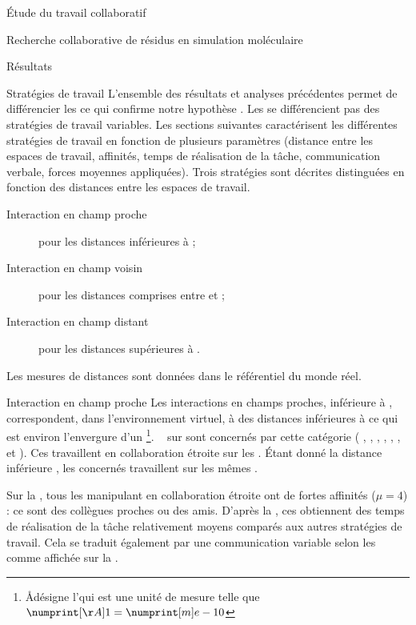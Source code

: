 \documentclass[myfrancais]{mythesis}
\begin{document}
\begin{mypart}{Étude du travail collaboratif}
\begin{mychapter}{Recherche collaborative de résidus en simulation moléculaire}
\begin{mysection}{Résultats}
\begin{mysubsection}{Stratégies de travail}
					L'ensemble des résultats et analyses précédentes permet de différencier les  ce qui confirme notre hypothèse .
					Les  se différencient pas des stratégies de travail variables.
					Les sections suivantes caractérisent les différentes stratégies de travail en fonction de plusieurs paramètres (distance entre les espaces de travail, affinités, temps de réalisation de la tâche, communication verbale, forces moyennes appliquées).
					Trois stratégies sont décrites distinguées en fonction des distances entre les espaces de travail.
					\begin{description}
						\item[Interaction en champ proche] pour les distances inférieures à ;
						\item[Interaction en champ voisin] pour les distances comprises entre  et ;
						\item[Interaction en champ distant] pour les distances supérieures à .
					\end{description}
					Les mesures de distances sont données dans le référentiel du monde réel.

					\begin{mysubsubsection}{Interaction en champ proche}
						Les interactions en champs proches, inférieure à , correspondent, dans l'environnement virtuel, à des distances inférieures à  ce qui est environ l'envergure d'un \footnote{\og \AA \fg désigne l'\myangstrom qui est une unité de mesure telle que $\mynum[\AA]{1} = \mynum[m]{e-10}$}.
						~ sur  sont concernés par cette catégorie ( , , , , , ,  et ).
						Ces  travaillent en collaboration étroite sur les .
						Étant donné la distance inférieure , les  concernés travaillent sur les mêmes .

						Sur la , tous les  manipulant en collaboration étroite ont de fortes affinités ($\mu = 4$) : ce sont des collègues proches ou des amis.
						D'après la , ces  obtiennent des temps de réalisation de la tâche relativement moyens comparés aux autres stratégies de travail.
						Cela se traduit également par une communication variable selon les  comme affichée sur la .


\end{mysubsubsection}
\end{mysubsection}
\end{mysection}
\end{mychapter}
\end{mypart}
\end{document}
